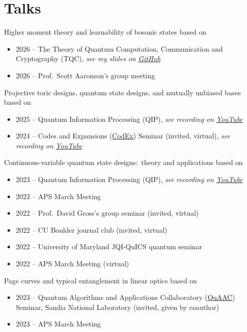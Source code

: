 \section{Talks}

\cventry
  {}
  {Higher moment theory and learnability of bosonic states}
  {based on \cite{iosue2025higher-moment-t}}
  {}
  {}
  {
  \begin{itemize}
      \item 2026 -- The Theory of Quantum Computation, Communication and Cryptography (TQC), {\em see my slides on \href{https://github.com/jtiosue/learning-bosons/blob/main/TQC2026Presentation/main.pdf}{GitHub}}
      \item 2026 -- Prof.~Scott Aaronson's group meeting
  \end{itemize}
  }

\cventry
  {}
  {Projective toric designs, quantum state designs, and mutually unbiased bases}
  {based on~\cite{iosue2024projective-tori}}
  {}
  {}
  {
  \begin{itemize}
      \item 2025 -- Quantum Information Processing (QIP), {\em see recording on \href{https://youtu.be/zukyDkl9UEY?si=p_ET1ffrKhJnx3vh}{YouTube}}
      \item 2024 -- Codes and Expansions (\href{https://www.math.colostate.edu/~king/codex/}{CodEx}) Seminar (invited, virtual), {\em see recording on \href{https://youtu.be/Wi7-Q98M3-E?si=Rqc28Cn_Ju8ZQmwE}{YouTube}}
  \end{itemize}
  }

\cventry
  {}
  {Continuous-variable quantum state designs:~theory and applications}
  {based on \cite{iosue2024continuous-vari}}
  {}
  {}
  {
    \begin{itemize}
        \item 2023 -- Quantum Information Processing (QIP), {\em see recording on \href{https://youtu.be/yiH0L8PYmTo}{YouTube}}
        \item 2023 -- APS March Meeting
        \item 2022 -- Prof.~David Gross's group seminar (invited, virtual)
        \item 2022 -- CU Boulder journal club (invited, virtual)
        \item 2022 -- University of Maryland JQI-QuICS quantum seminar
        \item 2022 -- APS March Meeting (virtual)
    \end{itemize}
  }


\cventry
  {}
  {Page curves and typical entanglement in linear optics}
  {based on \cite{iosue2023page-curves-and}}
  {}
  {}
  {
    \begin{itemize}
        \item 2023 -- Quantum Algorithms and Applications Collaboratory (\href{https://www.sandia.gov/quantum/quaac/}{QuAAC}) Seminar, Sandia National Laboratory (invited, given by coauthor)
        \item 2023 -- APS March Meeting
    \end{itemize}
  }


